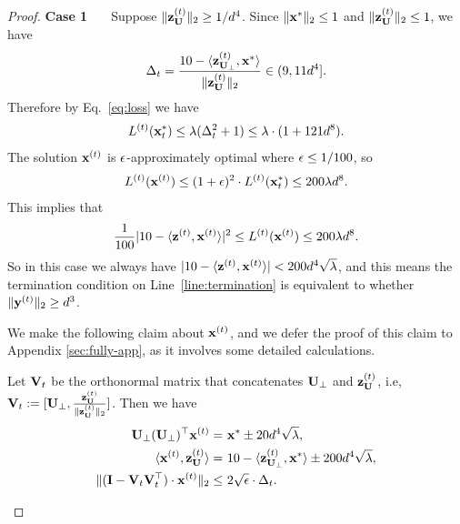 \begin{proof}
\vspace{+2mm}
{\bf \noindent Case 1 \ \ } Suppose $\|\mathbf{z}_{\mathbf{U}}^{(t)}\|_2 \geq 1/d^4$. Since $\|\mathbf{x}^{*}\|_2 \leq 1$ and $\|\mathbf{z}_{\mathbf{U}}^{(t)}\|_2 \leq 1$, we have 
\begin{align}\label{eq:Delta_bound}
\Delta_{t} = \frac{10 - \langle \mathbf{z}_{\mathbf{U}_\perp}^{(t)}, \mathbf{x}^{*}\rangle}{\|\mathbf{z}_{\mathbf{U}}^{(t)}\|_2} \in (9,  11d^4].
\end{align}
Therefore by Eq.~\eqref{eq:loss} we have
\begin{align*}
L^{(t)}(\mathbf{x}_{t}^{*}) \leq \lambda (\Delta_{t}^2 + 1) \leq \lambda \cdot (1 + 121d^8).
\end{align*}
The solution $\mathbf{x}^{(t)}$ is $\epsilon$-approximately optimal where $\epsilon \leq 1/100$, so
\begin{align}
L^{(t)}(\mathbf{x}^{(t)}) \leq (1+\epsilon)^2 \cdot L^{(t)}(\mathbf{x}_{t}^*) \leq 200\lambda d^8. \label{eq:loss2}
\end{align} 
This implies that
\[
\frac{1}{100} |10 - \langle \mathbf{z}^{(t)}, \mathbf{x}^{(t)}\rangle|^2 \leq L^{(t)}(\mathbf{x}^{(t)}) \leq 200 \lambda d^8.
\]
So in this case we always have $|10 - \langle \mathbf{z}^{(t)}, \mathbf{x}^{(t)}\rangle| < 200 d^4\sqrt{\lambda}$, and this means the termination condition on Line~\ref{line:termination} is equivalent to whether $\|\mathbf{y}^{(t)}\|_2 \geq d^3$.


We make the following claim about $\mathbf{x}^{(t)}$, and we defer the proof of this claim to Appendix \ref{sec:fully-app}, as it involves some detailed calculations.
\begin{claim}
\label{claim:decomposition}
Let $\mathbf{V}_{t}$ be the orthonormal matrix that concatenates $\mathbf{U}_\perp$ and $\mathbf{z}_{\mathbf{U}}^{(t)}$, i.e, $\mathbf{V}_{t} := [\mathbf{U}_\perp, \frac{\mathbf{z}_{\mathbf{U}}^{(t)}}{\|\mathbf{z}_{\mathbf{U}}^{(t)}\|_2}]$. Then we have
\begin{align*}
\mathbf{U}_\perp(\mathbf{U}_\perp)^{\top} \mathbf{x}^{(t)} = &~  \mathbf{x}^{*} \pm 20d^4 \sqrt{\lambda}, \\
\langle \mathbf{x}^{(t)}, \mathbf{z}_{\mathbf{U}}^{(t)}\rangle = &~  10 - \langle \mathbf{z}_{\mathbf{U}_\perp}^{(t)},\mathbf{x}^{*}\rangle \pm 200d^4 \sqrt{\lambda}, \\
\|(\mathbf{I} - \mathbf{V}_{t}\mathbf{V}_{t}^{\top}) \cdot \mathbf{x}^{(t)}\|_2 \leq &~ 2\sqrt{\epsilon} \cdot \Delta_{t}.
\end{align*}
\end{claim}




\end{proof}
